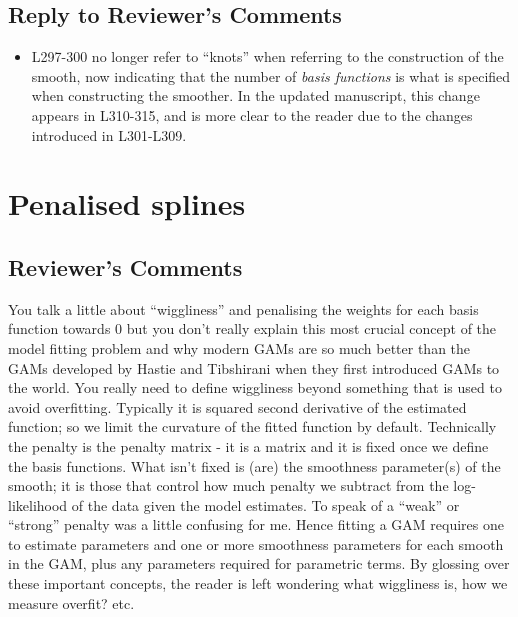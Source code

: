 \documentclass[
]{article}
\providecommand{\tightlist}{%
  \setlength{\itemsep}{0pt}\setlength{\parskip}{0pt}}
\begin{document}
\hypertarget{section-5}{%
\subsection{\texorpdfstring{\textcolor{reviewersblue} {Reply to Reviewer's Comments}}{}}\label{section-5}}

\begin{itemize}
\tightlist
\item
  L297-300 no longer refer to ``knots'' when referring to the construction of the smooth, now indicating that the number of \emph{basis functions} is what is specified when constructing the smoother. In the updated manuscript, this change appears in L310-315, and is more clear to the reader due to the changes introduced in L301-L309.
\end{itemize}

\hypertarget{penalised-splines}{%
\section{Penalised splines}\label{penalised-splines}}

\hypertarget{reviewers-comments-5}{%
\subsection{Reviewer's Comments}\label{reviewers-comments-5}}

You talk a little about ``wiggliness'' and penalising the weights for each basis function towards 0 but you don't really explain this most crucial concept of the model fitting problem and why modern GAMs are so much better than the GAMs developed by Hastie and Tibshirani when they first introduced GAMs to the world.
You really need to define wiggliness beyond something that is used to avoid overfitting. Typically it is squared second derivative of the estimated function; so we limit the curvature of the fitted function by default. Technically the penalty is the penalty matrix - it is a matrix and it is fixed once we define the basis functions. What isn't fixed is (are) the smoothness parameter(s) of the smooth; it is those that control how much penalty we subtract from the log-likelihood of the data given the model estimates. To speak of a ``weak'' or ``strong'' penalty was a little confusing for me.
Hence fitting a GAM requires one to estimate parameters and one or more smoothness parameters for each smooth in the GAM, plus any parameters required for parametric terms.
By glossing over these important concepts, the reader is left wondering what wiggliness is, how we measure overfit? etc.
\end{document}

